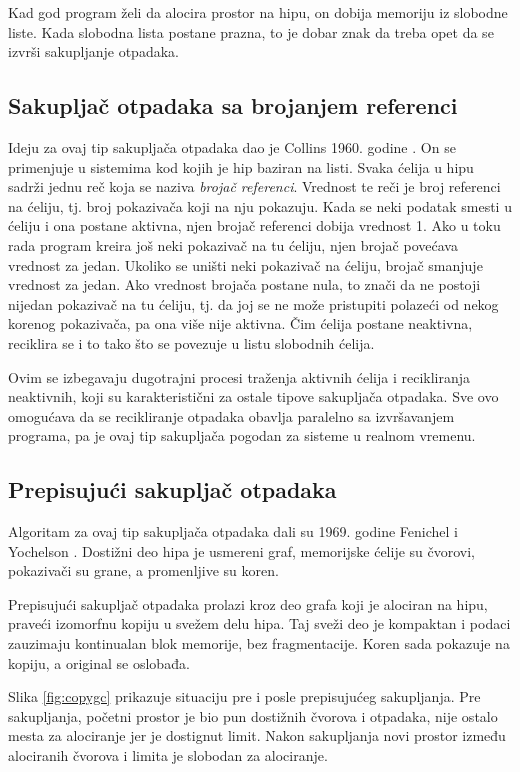 \documentclass[a4paper]{article}
\begin{document}
Kad god program želi da alocira prostor na hipu, on dobija memoriju iz slobodne liste. Kada slobodna lista postane prazna, to je dobar znak da treba opet da se izvrši sakupljanje otpadaka.

\subsection{Sakupljač otpadaka sa brojanjem referenci}
\label{ref:reference counter}

Ideju za ovaj tip sakupljača otpadaka dao je Collins 1960. godine \cite{col60}. On se primenjuje u sistemima kod kojih je hip baziran na listi. Svaka ćelija u hipu sadrži jednu reč koja se naziva \textit{brojač referenci}. Vrednost te reči je broj referenci na ćeliju, tj. broj pokazivača koji na nju pokazuju. Kada se neki podatak smesti u ćeliju i ona postane aktivna, njen brojač referenci dobija vrednost 1. Ako u toku rada program kreira još neki pokazivač na tu ćeliju, njen brojač povećava vrednost za jedan. Ukoliko se uništi neki pokazivač na ćeliju, brojač smanjuje vrednost za jedan. Ako vrednost brojača postane nula, to znači da ne postoji nijedan pokazivač na tu ćeliju, tj. da joj se ne može pristupiti polazeći od nekog korenog pokazivača, pa ona više nije aktivna. Čim ćelija postane neaktivna, reciklira se i to tako što se povezuje u listu slobodnih ćelija.

Ovim se izbegavaju dugotrajni procesi traženja aktivnih ćelija i recikliranja neaktivnih, koji su karakteristični za ostale tipove sakupljača otpadaka. Sve ovo omogućava da se recikliranje otpadaka obavlja paralelno sa izvršavanjem programa, pa je ovaj tip sakupljača pogodan za sisteme u realnom vremenu.

\subsection{Prepisujući sakupljač otpadaka}

Algoritam za ovaj tip sakupljača otpadaka dali su 1969. godine Fenichel i
Yochelson \cite{feni69}. Dostižni deo hipa je usmereni graf, memorijske ćelije su čvorovi, pokazivači su grane, a promenljive su koren.

Prepisujući sakupljač otpadaka prolazi kroz deo grafa koji je alociran na hipu, praveći izomorfnu kopiju u svežem delu hipa. Taj sveži deo je kompaktan i podaci zauzimaju kontinualan blok memorije, bez fragmentacije. Koren sada pokazuje na kopiju, a original se oslobađa. 

Slika \ref{fig:copygc} prikazuje situaciju pre i posle prepisujućeg sakupljanja. Pre sakupljanja, početni prostor je bio pun dostižnih čvorova i otpadaka, nije ostalo mesta za alociranje jer je dostignut limit. Nakon sakupljanja novi prostor između alociranih čvorova i limita je slobodan za alociranje.
\end{document}
